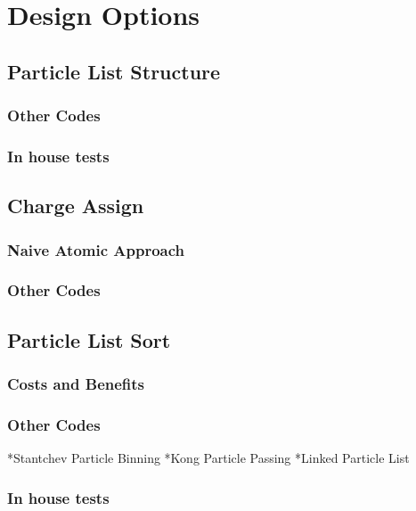 \chapter{Design Options}
	\section{Particle List Structure}
		\subsection{Other Codes}
		\subsection{In house tests}

	\section{Charge Assign}
		\subsection{Naive Atomic Approach}
		\subsection{Other Codes}

	\section{Particle List Sort}
		\subsection{Costs and Benefits}
		\subsection{Other Codes}
		*Stantchev Particle Binning
		*Kong Particle Passing
		*Linked Particle List
		\subsection{In house tests}

